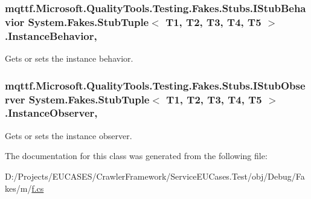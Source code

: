 \hypertarget{class_system_1_1_fakes_1_1_stub_tuple_3_01_t1_00_01_t2_00_01_t3_00_01_t4_00_01_t5_01_4_ac8753015aeab9d996c611668b12d4bbc}{
\subsubsection[{Instance\-Behavior}]{\setlength{\rightskip}{0pt plus 5cm}mqttf.\-Microsoft.\-Quality\-Tools.\-Testing.\-Fakes.\-Stubs.\-I\-Stub\-Behavior System.\-Fakes.\-Stub\-Tuple$<$ T1, T2, T3, T4, T5 $>$.Instance\-Behavior\hspace{0.3cm}{\ttfamily [get]}, {\ttfamily [set]}}}\label{class_system_1_1_fakes_1_1_stub_tuple_3_01_t1_00_01_t2_00_01_t3_00_01_t4_00_01_t5_01_4_ac8753015aeab9d996c611668b12d4bbc}


Gets or sets the instance behavior.

\hypertarget{class_system_1_1_fakes_1_1_stub_tuple_3_01_t1_00_01_t2_00_01_t3_00_01_t4_00_01_t5_01_4_a8f4285a16a0c9604f813d9c8ede69731}{
\subsubsection[{Instance\-Observer}]{\setlength{\rightskip}{0pt plus 5cm}mqttf.\-Microsoft.\-Quality\-Tools.\-Testing.\-Fakes.\-Stubs.\-I\-Stub\-Observer System.\-Fakes.\-Stub\-Tuple$<$ T1, T2, T3, T4, T5 $>$.Instance\-Observer\hspace{0.3cm}{\ttfamily [get]}, {\ttfamily [set]}}}\label{class_system_1_1_fakes_1_1_stub_tuple_3_01_t1_00_01_t2_00_01_t3_00_01_t4_00_01_t5_01_4_a8f4285a16a0c9604f813d9c8ede69731}


Gets or sets the instance observer.



The documentation for this class was generated from the following file\-:\begin{DoxyCompactItemize}
\item 
D\-:/\-Projects/\-E\-U\-C\-A\-S\-E\-S/\-Crawler\-Framework/\-Service\-E\-U\-Cases.\-Test/obj/\-Debug/\-Fakes/m/\hyperlink{m_2f_8cs}{f.\-cs}\end{DoxyCompactItemize}
